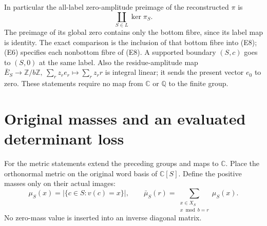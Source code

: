 \documentclass[11pt]{article}
\newcommand{\Z}{\mathbb Z}
\newcommand{\C}{\mathbb C}
\begin{document}
In particular the all-label zero-amplitude preimage of the reconstructed
\(\pi\) is
\[
 \coprod_{S\in L}\ker\pi_S .
 \tag{E8}
\]
The preimage of its global zero contains only the bottom fibre, since its
label map is identity.  The exact comparison is the inclusion of that
bottom fibre into (E8); (E6) specifies each nonbottom fibre of (E8).
A supported boundary \((S,c)\) goes to \((S,0)\) at the same label.
Also the residue-amplitude map
\(\bar E_S\to\Z/b\Z,\ \sum_rz_re_r\mapsto\sum_rz_rr\) is integral linear;
it sends the present vector \(e_0\) to zero.  These statements require no
map from \(\C\) or \(\mathbb Q\) to the finite group.

\section{Original masses and an evaluated determinant loss}

For the metric statements extend the preceding groups and maps to \(\C\).
Place the orthonormal metric on the original word basis of \(\C[S]\).
Define the positive masses only on their actual images:
\[
 \mu_S(x)=|\{c\in S:v(c)=x\}|,\qquad
 \bar\mu_S(r)=\sum_{\substack{x\in X_S\\x\bmod b=r}}\mu_S(x).
 \tag{E9}
\]
No zero-mass value is inserted into an inverse diagonal matrix.
\end{document}
